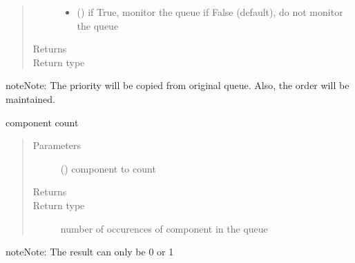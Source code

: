 \documentclass[letterpaper,10pt,english]{sphinxmanual}
\begin{document}
\begin{fulllineitems}
\begin{fulllineitems}
\begin{quote}
\begin{description}
\begin{itemize}
\item {} 
 () \textendash{} if True, monitor the queue 
if False (default), do not monitor the queue

\end{itemize}

\item[{Returns}] \leavevmode
{}

\item[{Return type}] \leavevmode
{\hyperref[\detokenize{Reference:salabim.Queue}]{}}

\end{description}\end{quote}

\begin{sphinxadmonition}{note}{Note:}
The priority will be copied from original queue.
Also, the order will be maintained.
\end{sphinxadmonition}

\end{fulllineitems}


\begin{fulllineitems}
\label{\detokenize{Reference:salabim.Queue.count}}
component count
\begin{quote}\begin{description}
\item[{Parameters}] \leavevmode
{} ({\hyperref[\detokenize{Reference:salabim.Component}]{}}) \textendash{} component to count

\item[{Returns}] \leavevmode


\item[{Return type}] \leavevmode
number of occurences of component in the queue

\end{description}\end{quote}

\begin{sphinxadmonition}{note}{Note:}
The result can only be 0 or 1
\end{sphinxadmonition}

\end{fulllineitems}


\end{fulllineitems}
\end{document}
